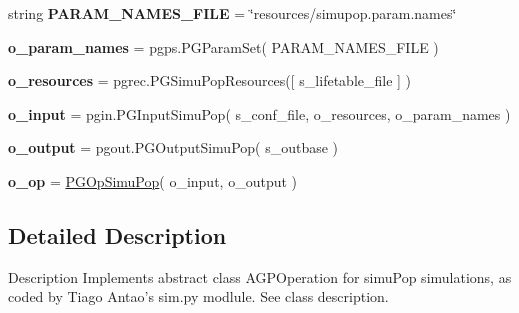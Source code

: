\begin{DoxyCompactItemize}
\item 
string {\bfseries P\+A\+R\+A\+M\+\_\+\+N\+A\+M\+E\+S\+\_\+\+F\+I\+LE} = \char`\"{}resources/simupop.\+param.\+names\char`\"{}\hypertarget{namespacenegui_1_1pgopsimupop_aad850f306d5042024ebb7ecbb882b887}{}\label{namespacenegui_1_1pgopsimupop_aad850f306d5042024ebb7ecbb882b887}

\item 
{\bfseries o\+\_\+param\+\_\+names} = pgps.\+P\+G\+Param\+Set( P\+A\+R\+A\+M\+\_\+\+N\+A\+M\+E\+S\+\_\+\+F\+I\+LE )\hypertarget{namespacenegui_1_1pgopsimupop_a19188f6d1a8be14d817f714253f72524}{}\label{namespacenegui_1_1pgopsimupop_a19188f6d1a8be14d817f714253f72524}

\item 
{\bfseries o\+\_\+resources} = pgrec.\+P\+G\+Simu\+Pop\+Resources(\mbox{[} s\+\_\+lifetable\+\_\+file \mbox{]} )\hypertarget{namespacenegui_1_1pgopsimupop_a2e48d554443220321fa4e2d7d54ce6d0}{}\label{namespacenegui_1_1pgopsimupop_a2e48d554443220321fa4e2d7d54ce6d0}

\item 
{\bfseries o\+\_\+input} = pgin.\+P\+G\+Input\+Simu\+Pop( s\+\_\+conf\+\_\+file, o\+\_\+resources, o\+\_\+param\+\_\+names )\hypertarget{namespacenegui_1_1pgopsimupop_af6081fd95bb8d80f4596802ee94584f4}{}\label{namespacenegui_1_1pgopsimupop_af6081fd95bb8d80f4596802ee94584f4}

\item 
{\bfseries o\+\_\+output} = pgout.\+P\+G\+Output\+Simu\+Pop( s\+\_\+outbase )\hypertarget{namespacenegui_1_1pgopsimupop_a7a8ef84b45b8957cdb95d853da85e2a6}{}\label{namespacenegui_1_1pgopsimupop_a7a8ef84b45b8957cdb95d853da85e2a6}

\item 
{\bfseries o\+\_\+op} = \hyperlink{classnegui_1_1pgopsimupop_1_1PGOpSimuPop}{P\+G\+Op\+Simu\+Pop}( o\+\_\+input, o\+\_\+output )\hypertarget{namespacenegui_1_1pgopsimupop_a5a81830b86fd00feca327e6861c2abe8}{}\label{namespacenegui_1_1pgopsimupop_a5a81830b86fd00feca327e6861c2abe8}

\end{DoxyCompactItemize}


\subsection{Detailed Description}
\begin{DoxyVerb}Description
Implements abstract class AGPOperation for simuPop simulations,
as coded by Tiago Antao's sim.py modlule.  See class description.
\end{DoxyVerb}
 
